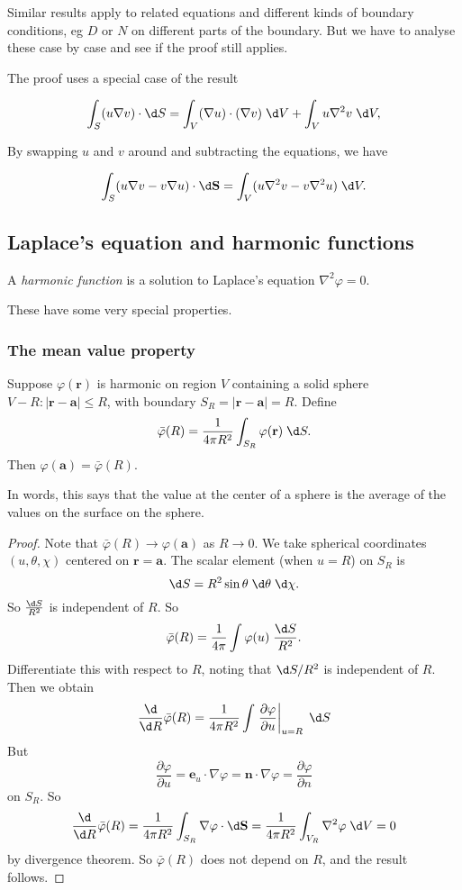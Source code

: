 \documentclass[a4paper]{article}
\begin{document}
\note Similar results apply to related equations and different kinds of boundary conditions, eg $D$ or $N$ on different parts of the boundary. But we have to analyse these case by case and see if the proof still applies.


The proof uses a special case of the result
\begin{prop}
  \[
    \int_S (u\nabla v)\cdot \d S = \int_V (\nabla u)\cdot (\nabla v)\;\d V + \int_V u\nabla^2 v\;\d V,
  \]
\end{prop}
By swapping $u$ and $v$ around and subtracting the equations, we have
\begin{prop}
  \[
    \int_S (u\nabla v - v\nabla u)\cdot\d \mathbf{S} = \int_V (u\nabla^2 v - v\nabla^2 u)\;\d V.
  \]
\end{prop}
\subsection{Laplace's equation and harmonic functions}
\begin{defi}
  A \emph{harmonic function} is a solution to Laplace's equation $\nabla^2\varphi = 0$.
\end{defi}
These have some very special properties.
\subsubsection{The mean value property}
\begin{prop}
  Suppose $\varphi(\mathbf{r})$ is harmonic on region $V$ containing a solid sphere $V-R: |\mathbf{r} - \mathbf{a}| \leq R$, with boundary $S_R = |\mathbf{r} - \mathbf{a}| = R$. Define
  \[
    \bar\varphi (R) = \frac{1}{4\pi R^2}\int_{S_R}\varphi(\mathbf{r})\;\d S.
  \]
  Then $\varphi(\mathbf{a}) = \bar\varphi (R)$.
\end{prop}
In words, this says that the value at the center of a sphere is the average of the values on the surface on the sphere.

\begin{proof}
  Note that $\bar\varphi (R) \to \varphi(\mathbf{a})$ as $R \to 0$. We take spherical coordinates $(u, \theta, \chi)$ centered on $\mathbf{r} = \mathbf{a}$. The scalar element (when $u = R$) on $S_R$ is
  \[
    \d S = R^2 \sin \theta\;\d \theta\;\d \chi.
  \]
  So $\frac{\d S}{R^2}$ is independent of $R$. So
  \[
    \bar\varphi(R) = \frac{1}{4\pi}\int \varphi(u)\;\frac{\d S}{R^2}.
  \]
  Differentiate this with respect to $R$, noting that $\d S/R^2$ is independent of $R$. Then we obtain
  \[
    \frac{\d}{\d R}\bar\varphi(R) = \frac{1}{4\pi R^2}\int \left.\frac{\partial \varphi}{\partial u}\right|_{u = R}\;\d S
  \]
  But
  \[
    \frac{\partial\varphi}{\partial u} = \mathbf{e}_u \cdot \nabla \varphi = \mathbf{n}\cdot \nabla \varphi = \frac{\partial\varphi}{\partial n}
  \]
  on $S_R$. So
  \[
    \frac{\d}{\d R}\bar\varphi(R) = \frac{1}{4\pi R^2}\int_{S_R} \nabla \varphi \cdot \d \mathbf{S} = \frac{1}{4\pi R^2}\int_{V_R}\nabla^2 \varphi \;\d V = 0
  \]
  by divergence theorem. So $\bar \varphi(R)$ does not depend on $R$, and the result follows.
\end{proof}
\end{document}
